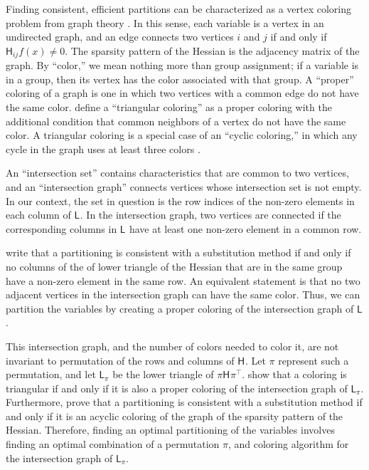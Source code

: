 \documentclass[jss]{jss}\usepackage[]{graphicx}\usepackage[]{color}
\newcommand{\hess}[2]{\mathsf{H}_{#1}#2}
\newcommand{\hessLT}[2]{\mathsf{L}_{#1}#2}
\begin{document}
Finding consistent, efficient partitions can be
characterized as a vertex coloring problem from graph theory \citep{ColemanMore1984}.  In this
sense, each variable is a vertex in an undirected graph, and an edge connects two
vertices $i$ and $j$ if and only if ${\hess{ij}{f(x)}\neq 0}$.  The
sparsity pattern of the Hessian is the adjacency matrix of the graph.
By ``color,'' we mean nothing more than group assignment; if a
variable is in a group, then its vertex has the color associated with
that group.  A ``proper'' coloring of a graph is one in which two
vertices with a common edge do not have the same
color.  define a ``triangular coloring'' as
a proper coloring with the additional condition that common
neighbors of a vertex do not have the same color.  A triangular
coloring is a special case of an ``cyclic coloring,'' in which any cycle in the graph
uses at least three colors \citep{GebremedhinTarafdar2007}.

An ``intersection set'' contains characteristics that are common to two vertices, and
an ``intersection graph'' connects vertices whose intersection set is
not empty.  In our context, the set in question is the row indices of
the non-zero elements in each column of $\hessLT{}{}$.  In the
intersection graph, two vertices are connected if the corresponding
columns in $\hessLT{}{}$ have at least one non-zero element in a common row.

 write that a partitioning is consistent with a
substitution method if and only if no columns
of the of lower triangle of the Hessian that are
in the same group have a non-zero element in the same
row.  An equivalent statement is that no two adjacent vertices in the
intersection graph can have the same color.  Thus, we can partition
the variables by creating a proper coloring of the intersection graph
of $\hessLT{}{}$.

This intersection graph, and the number of colors needed to
color it, are not invariant to
permutation of the rows and columns of $\hess{}{}$.  Let $\pi$
represent such a permutation, and let $\hessLT{\pi}{}$ be the lower
triangle of $\pi\hess{}{}{\pi^\top}$.     show that a coloring is triangular if and only
if it is also a proper coloring of the intersection
graph of $\hessLT{\pi}{}$.  Furthermore,
\citet{ColemanCai1986} prove that a partitioning is consistent with a
substitution method if and only if it is an acyclic coloring of the
graph of the sparsity pattern of the Hessian.   Therefore,
finding an optimal partitioning of the variables involves finding an
optimal combination of a permutation $\pi$, and coloring algorithm
for the intersection graph of $\hessLT{\pi}{}$.
\end{document}
